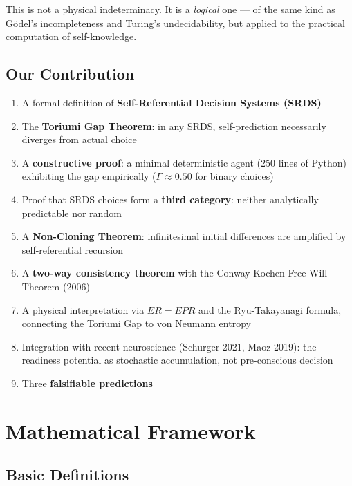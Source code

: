 \documentclass[12pt,a4paper]{article}
\theoremstyle{definition}
\theoremstyle{remark}
\begin{document}
This is not a physical indeterminacy. It is a \emph{logical} one --- of the
same kind as G\"odel's incompleteness and Turing's undecidability, but applied
to the practical computation of self-knowledge.

\subsection{Our Contribution}

\begin{enumerate}[itemsep=0pt]
\item A formal definition of \textbf{Self-Referential Decision Systems (SRDS)}
\item The \textbf{Toriumi Gap Theorem}: in any SRDS, self-prediction necessarily diverges from actual choice
\item A \textbf{constructive proof}: a minimal deterministic agent (250 lines
  of Python) exhibiting the gap empirically ($\Gamma \approx 0.50$ for binary choices)
\item Proof that SRDS choices form a \textbf{third category}: neither analytically predictable nor random
\item A \textbf{Non-Cloning Theorem}: infinitesimal initial differences are amplified by self-referential recursion
\item A \textbf{two-way consistency theorem} with the Conway-Kochen Free Will Theorem (2006)
\item A physical interpretation via $ER = EPR$ and the Ryu-Takayanagi formula,
  connecting the Toriumi Gap to von Neumann entropy
\item Integration with recent neuroscience (Schurger 2021, Maoz 2019):
  the readiness potential as stochastic accumulation, not pre-conscious decision
\item Three \textbf{falsifiable predictions}
\end{enumerate}

\section{Mathematical Framework}

\subsection{Basic Definitions}
\end{document}
